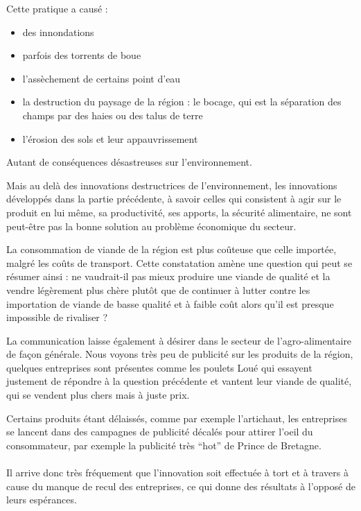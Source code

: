 \documentclass[a4paper,12pt]{report}
\begin{document}
			Cette pratique a causé :
			\begin{itemize}
				\item des innondations
				\item parfois des torrents de boue
				\item l’assèchement de certains point d’eau
				\item la destruction du paysage de la région : le bocage, qui est la séparation des champs par des haies ou des talus de terre
				\item l’érosion des sols et leur appauvrissement
			\end{itemize}
			
			Autant de conséquences désastreuses sur l’environnement.	
			
			Mais au delà des innovations destructrices de l’environnement, les innovations développés dans la partie précédente, à savoir celles qui consistent à agir sur le produit en lui même, sa productivité, ses apports, la sécurité alimentaire, ne sont peut-être pas la bonne solution au problème économique du secteur.
			
			La consommation de viande de la région est plus coûteuse que celle importée, malgré les coûts de transport. Cette constatation amène une question qui peut se résumer ainsi : ne vaudrait-il pas mieux produire une viande de qualité et la vendre légèrement plus chère plutôt que de continuer à lutter contre les importation de viande de basse qualité et à faible coût alors qu’il est presque impossible de rivaliser ?
			
			La communication laisse également à désirer dans le secteur de l’agro-alimentaire de façon générale. Nous voyons très peu de publicité sur les produits de la région, quelques entreprises sont présentes comme les poulets Loué qui essayent justement de répondre à la question précédente et vantent leur viande de qualité, qui se vendent plus chers mais à juste prix.

			Certains produits étant délaissés, comme par exemple l’artichaut, les entreprises se lancent dans des campagnes de publicité décalés pour attirer l’oeil du consommateur, par exemple la publicité très “hot” de Prince de Bretagne.
			
			\paragraph{}Il arrive donc très fréquement que l'innovation soit effectuée à tort et à travers à cause du manque de recul des entreprises, ce qui donne des résultats à l'opposé de leurs espérances.
			
\end{document}
